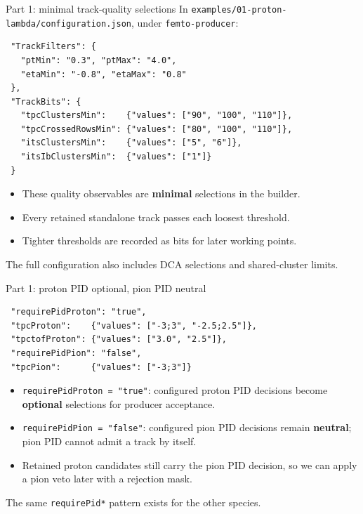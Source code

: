 \begin{frame}[fragile]{Part 1: minimal track-quality selections}
 \small In \texttt{examples/01-proton-lambda/configuration.json}, under \texttt{femto-producer}:
 \begin{lstlisting}
 "TrackFilters": {
   "ptMin": "0.3", "ptMax": "4.0",
   "etaMin": "-0.8", "etaMax": "0.8"
 },
 "TrackBits": {
   "tpcClustersMin":    {"values": ["90", "100", "110"]},
   "tpcCrossedRowsMin": {"values": ["80", "100", "110"]},
   "itsClustersMin":    {"values": ["5", "6"]},
   "itsIbClustersMin":  {"values": ["1"]}
 }
 \end{lstlisting}
 \begin{itemize}
 \item These quality observables are \textbf{minimal} selections in the builder.
 \item Every retained standalone track passes each loosest threshold.
 \item Tighter thresholds are recorded as bits for later working points.
 \end{itemize}
 \small The full configuration also includes DCA selections and shared-cluster limits.
\end{frame}

\begin{frame}[fragile]{Part 1: proton PID optional, pion PID neutral}
 \begin{lstlisting}
 "requirePidProton": "true",
 "tpcProton":    {"values": ["-3;3", "-2.5;2.5"]},
 "tpctofProton": {"values": ["3.0", "2.5"]},
 "requirePidPion": "false",
 "tpcPion":      {"values": ["-3;3"]}
 \end{lstlisting}
 \begin{itemize}
 \item \texttt{requirePidProton = "true"}: configured proton PID decisions become \textbf{optional} selections for producer acceptance.
 \item \texttt{requirePidPion = "false"}: configured pion PID decisions remain \textbf{neutral}; pion PID cannot admit a track by itself.
 \item Retained proton candidates still carry the pion PID decision, so we can apply a pion veto later with a rejection mask.
 \end{itemize}
 \small The same \texttt{requirePid*} pattern exists for the other species.
\end{frame}

